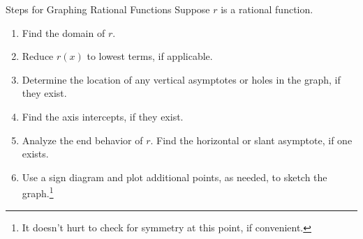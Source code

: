 \begin{mfloatbox}{Steps for Graphing Rational Functions}
\label{box:graphingrationalfunctions}
Suppose $r$ is a rational function. 

\begin{enumerate}

\item  Find the domain of $r$.

\item  Reduce $r(x)$ to lowest terms, if applicable.

\item  Determine the location of any vertical asymptotes or holes in the graph, if they exist. 

\item  Find the axis intercepts, if they exist.

\item  Analyze the end behavior of $r$.  Find the horizontal or slant asymptote, if one exists.

\item  Use a sign diagram and plot additional points, as needed, to sketch the graph.\footnote{It doesn't hurt to check for symmetry at this point, if convenient.}

\end{enumerate}

\end{mfloatbox}

